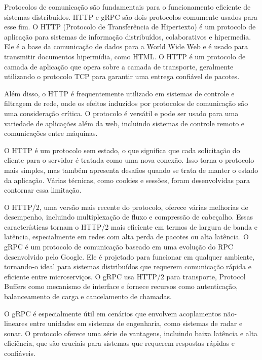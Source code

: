 Protocolos de comunicação são fundamentais para o funcionamento eficiente de sistemas distribuídos. HTTP e gRPC são dois protocolos comumente usados para esse fim. O HTTP (Protocolo de Transferência de Hipertexto) é um protocolo de aplicação para sistemas de informação distribuídos, colaborativos e hipermedia. Ele é a base da comunicação de dados para a World Wide Web e é usado para transmitir documentos hipermídia, como HTML\cite{fielding1999http}. O HTTP é um protocolo de camada de aplicação que opera sobre a camada de transporte, geralmente utilizando o protocolo TCP para garantir uma entrega confiável de pacotes.

Além disso, o HTTP é frequentemente utilizado em sistemas de controle e filtragem de rede, onde os efeitos induzidos por protocolos de comunicação são uma consideração crítica\cite{zou2021communication}. O protocolo é versátil e pode ser usado para uma variedade de aplicações além da web, incluindo sistemas de controle remoto e comunicações entre máquinas.

O HTTP é um protocolo sem estado, o que significa que cada solicitação do cliente para o servidor é tratada como uma nova conexão. Isso torna o protocolo mais simples, mas também apresenta desafios quando se trata de manter o estado da aplicação. Várias técnicas, como cookies e sessões, foram desenvolvidas para contornar essa limitação.

O HTTP/2, uma versão mais recente do protocolo, oferece várias melhorias de desempenho, incluindo multiplexação de fluxo e compressão de cabeçalho. Essas características tornam o HTTP/2 mais eficiente em termos de largura de banda e latência, especialmente em redes com alta perda de pacotes ou alta latência.
O gRPC é um protocolo de comunicação baseado em uma evolução do RPC desenvolvido pelo Google. Ele é projetado para funcionar em qualquer ambiente, tornando-o ideal para sistemas distribuídos que requerem comunicação rápida e eficiente entre microserviços\cite{grpc2015high}. O gRPC usa HTTP/2 para transporte, Protocol Buffers como mecanismo de interface e fornece recursos como autenticação, balanceamento de carga e cancelamento de chamadas.

O gRPC é especialmente útil em cenários que envolvem acoplamentos não-lineares entre unidades em sistemas de engenharia, como sistemas de radar e sonar\cite{xu2021dynamic}. O protocolo oferece uma série de vantagens, incluindo baixa latência e alta eficiência, que são cruciais para sistemas que requerem respostas rápidas e confiáveis.

